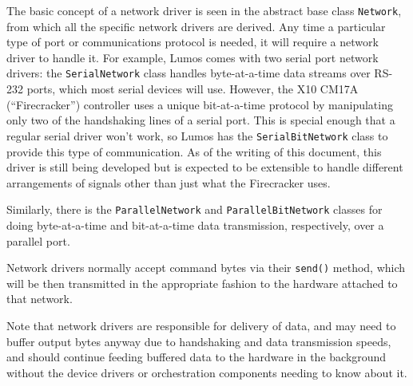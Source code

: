 \documentclass{article}
\begin{document}
The basic concept of a network driver is seen in the abstract base class
{\tt Network}, from which all the specific network drivers are derived.
Any time a particular type of port or communications protocol is needed,
it will require a network driver to handle it.  For example, Lumos comes
with two serial port network drivers:  the {\tt SerialNetwork} class
handles byte-at-a-time data streams over RS-232 ports, which most serial
devices will use.  However, the X10 CM17A (``Firecracker'') controller
uses a unique bit-at-a-time protocol by manipulating only two of the
handshaking lines of a serial port.  This is special enough that a
regular serial driver won't work, so Lumos has the {\tt SerialBitNetwork}
class to provide this type of communication.  As of the writing of this
document, this driver is still being developed but is expected to be
extensible to handle different arrangements of signals other than
just what the Firecracker uses.

Similarly, there is the {\tt ParallelNetwork} and {\tt ParallelBitNetwork}
classes for doing byte-at-a-time and bit-at-a-time data transmission, 
respectively, over a parallel port.

Network drivers normally accept command bytes via their {\tt send()} method,
which will be then transmitted in the appropriate fashion to the hardware
attached to that network.

Note that network drivers are responsible for delivery of data, and may 
need to buffer output bytes anyway due to handshaking and data transmission
speeds, and should continue feeding buffered data to the hardware in the
background without the device drivers or orchestration components needing
to know about it.
\end{document}
